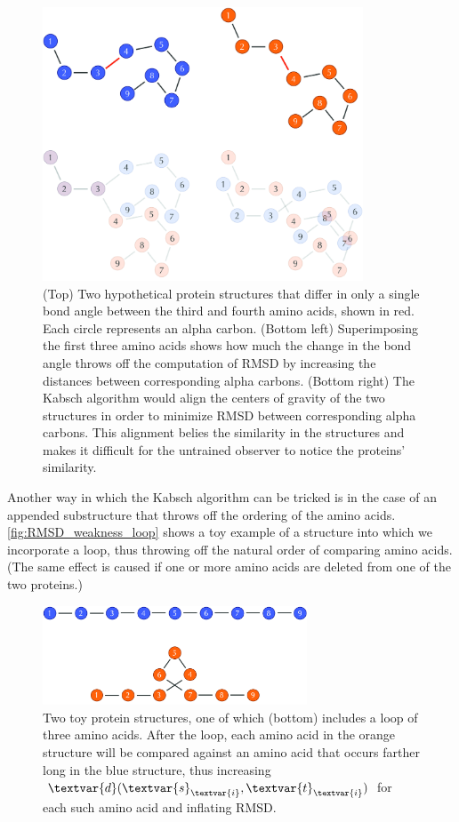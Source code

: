 \begin{figure}[p]
	\centering
	\mySfFamily
	\includegraphics[width = 0.85\textwidth]{../images_CMYK/RMSD_weakness_mutation}
	\caption{(Top) Two hypothetical protein structures that differ in only a single bond angle between the third and fourth amino acids, shown in red. Each circle represents an alpha carbon. (Bottom left) Superimposing the first three amino acids shows how much the change in the bond angle throws off the computation of RMSD by increasing the distances between corresponding alpha carbons. (Bottom right) The Kabsch algorithm would align the centers of gravity of the two structures in order to minimize RMSD between corresponding alpha carbons. This alignment belies the similarity in the structures and makes it difficult for the untrained observer to notice the proteins' similarity.}
	\label{fig:RMSD_weakness_mutation}
\end{figure}

Another way in which the Kabsch algorithm can be tricked is in the case of an appended substructure that throws off the ordering of the amino acids. \autoref{fig:RMSD_weakness_loop} shows a toy example of a structure into which we incorporate a loop, thus throwing off the natural order of comparing amino acids. (The same effect is caused if one or more amino acids are deleted from one of the two proteins.)

\begin{figure}[t]
	\centering
	\mySfFamily
	\includegraphics[width = 0.7\textwidth]{../images_CMYK/RMSD_weakness_loop}
	\caption{Two toy protein structures, one of which (bottom) includes a loop of three amino acids. After the loop, each amino acid in the orange structure will be compared against an amino acid that occurs farther long in the blue structure, thus increasing $\textvar{d}(\textvar{s}_{\textvar{i}}, \textvar{t}_{\textvar{i}})$ for each such amino acid and inflating RMSD.}
	\label{fig:RMSD_weakness_loop}
\end{figure}

